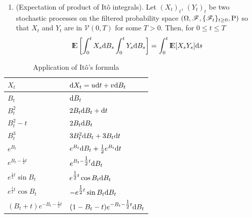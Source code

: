 \documentclass[a4paper,10pt]{scrbook}
\begin{document}
\begin{enumerate}
 \item (Expectation of product of It\^o integrals). Let $(X_t)_t$,  $(Y_t)_t$ be two 
       stochastic processes on the filtered probability space \((\Omega, \mathscr{F}, \{\mathscr{F}_t\}_{t\geq 0}, \mathrm{P})\) so that 
       $X_t$ and $Y_{t}$ are in $\mathcal{V}(0, T)$ for some $T>0$. Then, for $0 \leq t \leq T$
       \[
        \E\left[\int_0^t X_s \d B_s \int_0^t Y_s \d B_s\right] = \int_0^t \E[X_s Y_s]\d s
       \]

\end{enumerate}


\begin{table}[ht]
\caption{Application of It\^o's formula}
\begin{center}
{
  \renewcommand{\arraystretch}{2.0}
  \begin{tabular}{ p{3cm} | p{5cm} }
  $X_t$     & $\mathrm{d} X_t = u \mathrm{d} t + v \mathrm{d} B_t$\\ \hline 
  $B_t$     & $\mathrm{d} B_t$\\ 
  $B_t^2$   & $2 B_t \mathrm{d} B_t + \mathrm{d} t$\\ 
  $B_t^2 - t$ & $2 B_t \mathrm{d} B_t$\\ 
  $B_t^3$   & $3 B_t^2 \mathrm{d} B_t + 3 B_t \mathrm{d} t$\\ 
  $e^{B_t}$ & $e^{B_t}\mathrm{d} B_t + \tfrac{1}{2}e^{B_t}\mathrm{d} t$ \\
  $e^{B_t - \tfrac{1}{2}t}$ & $e^{B_t - \tfrac{1}{2}t} \mathrm{d} B_t$\\
  $e^{\tfrac{1}{2}t}\sin B_t$ & $e^{\tfrac{1}{2}t} \cos B_t \mathrm{d} B_t$ \\
  $e^{\tfrac{1}{2}t}\cos B_t$ & $-e^{\tfrac{1}{2}t} \sin B_t \mathrm{d} B_t$\\
  $(B_t + t) e^{-B_t - \tfrac{1}{2}t}$ & $(1 - B_t - t) e^{-B_t - \tfrac{1}{2}t} \mathrm{d} B_t$
  \end{tabular}
}
\end{center}
\end{table}
\end{document}
